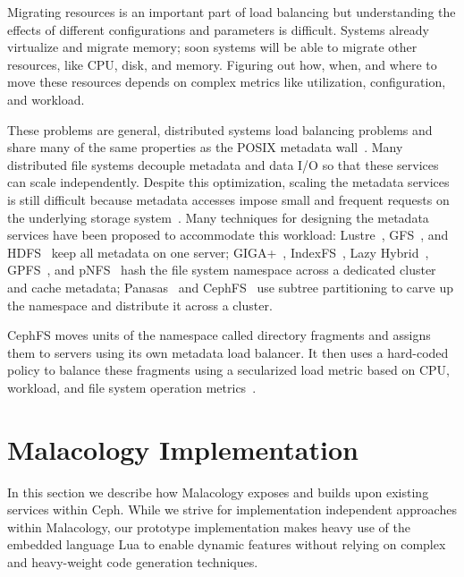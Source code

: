 \documentclass[10pt,twocolumn]{article}
\begin{document}
Migrating resources is an important part of load balancing but understanding the effects of different configurations and parameters is difficult. Systems already virtualize and migrate memory; soon systems will be able to migrate other resources, like CPU, disk, and memory. Figuring out how, when, and where to move these resources depends on complex metrics like utilization, configuration, and workload.

These problems are general, distributed systems load balancing problems and share many of the same properties as the POSIX metadata wall~\cite{alam:pdsw2011-metadata-scaling,ghemawat:sosp2003-gfs,hildebrand:msst2005-pnfs,weil_ceph_2006,welch:fast2008-panasas,shvachko:login2012-hdfs-scalability}. Many distributed file systems decouple metadata and data I/O so that
these services can scale independently. Despite
this optimization, scaling the metadata services is still difficult
because metadata accesses impose small and frequent requests on the
underlying storage system~\cite{roselli:atec2000-FS-workloads}. Many
techniques for designing the metadata services have been proposed to
accommodate this workload: Lustre~\cite{konstantinos:pdsw2014-lustre-metadata}, GFS~\cite{ghemawat:sosp2003-gfs}, and HDFS~\cite{shvachko:login2012-hdfs-scalability} keep all metadata on one
server; GIGA+~\cite{patil:fast2011-giga}, IndexFS~\cite{ren:sc2014-indexfs}, Lazy Hybrid~\cite{brandt:msst2003-lh}, GPFS~\cite{schmuck:fast2002-gpfs},
and pNFS~\cite{hildebrand:supercomputing2006-pNFS} hash the file
system namespace across a dedicated cluster and cache metadata; Panasas~\cite{welch:fast2008-panasas} and CephFS~\cite{weil:sc2004-dyn-metadata} use subtree partitioning to carve up the namespace and distribute it across a cluster.

CephFS moves units of the namespace called directory fragments and assigns them to servers using  its own metadata load balancer. It then uses a hard-coded policy to balance these fragments using a secularized load metric based on CPU, workload, and file system operation metrics~\cite{sevilla:sc15-mantle}.

\section{Malacology Implementation}
\label{implementation}

In this section we describe how Malacology exposes and builds upon existing
services within Ceph. While we strive for implementation independent
approaches within Malacology, our prototype implementation makes heavy use of
the embedded language Lua to enable dynamic features without relying on
complex and heavy-weight code generation techniques.
\end{document}
